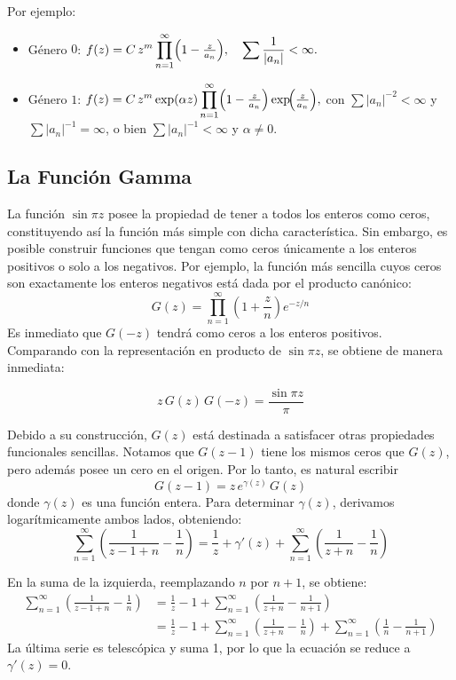 \documentclass{article}
\theoremstyle{nonumberplain}
\begin{document}
Por ejemplo:
\begin{itemize}
  \item Género \(0\): 
  \(\displaystyle
    f(z)
    =C\,z^{m}
    \prod_{n=1}^{\infty}
    \Bigl(1-\tfrac{z}{a_{n}}\Bigr),
    \quad
    \sum\frac1{|a_{n}|}<\infty.
  \)
  \item Género \(1\):
  \(\displaystyle
    f(z)
    =C\,z^{m}\exp(\alpha z)
    \prod_{n=1}^{\infty}
    \Bigl(1-\tfrac{z}{a_{n}}\Bigr)
    \exp\!\Bigl(\tfrac{z}{a_{n}}\Bigr),
  \)
  con \(\sum|a_{n}|^{-2}<\infty\) y \(\sum|a_{n}|^{-1}=\infty\), o bien 
  \(\sum|a_{n}|^{-1}<\infty\) y \(\alpha\neq0\).
\end{itemize}

\subsection*{La Función Gamma}

La función \( \sin \pi z \) posee la propiedad de tener a todos los enteros como ceros, constituyendo así la función más simple con dicha característica. Sin embargo, es posible construir funciones que tengan como ceros únicamente a los enteros positivos o solo a los negativos. Por ejemplo, la función más sencilla cuyos ceros son exactamente los enteros negativos está dada por el producto canónico:
\[
G(z) = \prod_{n=1}^{\infty} \left(1 + \frac{z}{n}\right) e^{-z/n}
\]
Es inmediato que \( G(-z) \) tendrá como ceros a los enteros positivos. Comparando con la representación en producto de \( \sin \pi z \), se obtiene de manera inmediata:

\[
z\, G(z)\, G(-z) = \frac{\sin \pi z}{\pi}
\]

Debido a su construcción, \( G(z) \) está destinada a satisfacer otras propiedades funcionales sencillas. Notamos que \( G(z-1) \) tiene los mismos ceros que \( G(z) \), pero además posee un cero en el origen. Por lo tanto, es natural escribir
\[
G(z-1) = z\, e^{\gamma(z)}\, G(z)
\]
donde \( \gamma(z) \) es una función entera. Para determinar \( \gamma(z) \), derivamos logarítmicamente ambos lados, obteniendo:
\[
\sum_{n=1}^{\infty} \left( \frac{1}{z-1+n} - \frac{1}{n} \right) = \frac{1}{z} + \gamma'(z) + \sum_{n=1}^{\infty} \left( \frac{1}{z+n} - \frac{1}{n} \right)
\]

En la suma de la izquierda, reemplazando \( n \) por \( n+1 \), se obtiene:
\[
\begin{aligned}
\sum_{n=1}^{\infty} \left( \frac{1}{z-1+n} - \frac{1}{n} \right)
&= \frac{1}{z} - 1 + \sum_{n=1}^{\infty} \left( \frac{1}{z+n} - \frac{1}{n+1} \right) \\
&= \frac{1}{z} - 1 + \sum_{n=1}^{\infty} \left( \frac{1}{z+n} - \frac{1}{n} \right) + \sum_{n=1}^{\infty} \left( \frac{1}{n} - \frac{1}{n+1} \right)
\end{aligned}
\]
La última serie es telescópica y suma 1, por lo que la ecuación se reduce a \( \gamma'(z) = 0 \).
\end{document}
